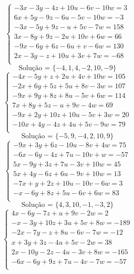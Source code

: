 \documentclass[12pt,oneside,a4paper]{article}
\begin{document}
\vspace{\baselineskip}
\begin{equation*}
\begin{cases}
-3x-3y-4z+10u-6v-10w=3 \\
6x+5y-9z-6u-5v-10w=-3 \\
-3x-5y+9z-u+5v-7w=158 \\
3x-8y+9z-2u+10v+6w=66 \\
-9x-6y+6z-6u+v-6w=130 \\
2x-3y-z+10u+3v+7w=-68 \\
\end{cases}
\end{equation*}
\begin{equation*}
\text{Solução = }\{-4,1,4,-2,10,-9\}
\end{equation*}
\vspace{\baselineskip}
\begin{equation*}
\begin{cases}
-4x-5y+z+2u+4v+10w=105 \\
-2x+6y+5z+5u+8v-3w=107 \\
-9x+9y+8z+8u-5v+6w=114 \\
7x+8y+5z-u+9v-4w=69 \\
-9x+2y+10z+10u-5v+3w=20 \\
-10x+4y-4z+4u+5v-9w=79 \\
\end{cases}
\end{equation*}
\begin{equation*}
\text{Solução = }\{-5,9,-4,2,10,9\}
\end{equation*}
\vspace{\baselineskip}
\begin{equation*}
\begin{cases}
-9x+3y+6z-10u-8v+4w=75 \\
-6x-6y-4z+7u-10v+w=-57 \\
5x-9y+3z+7u-3v+10w=45 \\
5x+4y-6z+6u-9v+10w=13 \\
-7x+y+2z+10u-10v-6w=3 \\
-x-6y+8z+5u-6v+6w=83 \\
\end{cases}
\end{equation*}
\begin{equation*}
\text{Solução = }\{4,3,10,-1,-3,2\}
\end{equation*}
\vspace{\baselineskip}
\begin{equation*}
\begin{cases}
4x-6y-7z+u+9v-2w=2 \\
-x-3y+10z+3u+5v+8w=-189 \\
-2x-7y-z+8u-6v-7w=-12 \\
x+3y+3z-4u+5v-2w=38 \\
2x-10y-2z-4u-3v+8w=-165 \\
-6x-6y+9z+7u-4v-7w=-57 \\
\end{cases}
\end{equation*}
\end{document}
